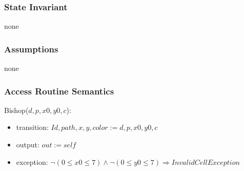 \documentclass[12pt]{article}
\begin{document}
\subsubsection* {State Invariant}

none

\subsubsection* {Assumptions}

none

\subsubsection* {Access Routine Semantics}

Bishop($d, p, x0, y0, c$):
\begin{itemize}
\item transition: $Id, path, x, y, color := d, p, x0, y0, c$
\item output: $out := \mathit{self}$
\item exception: $ \neg (0 \leq x0 \leq 7) \wedge  \neg (0 \leq y0 \leq 7) \Rightarrow InvalidCellException$
\end{itemize}
\end{document}
